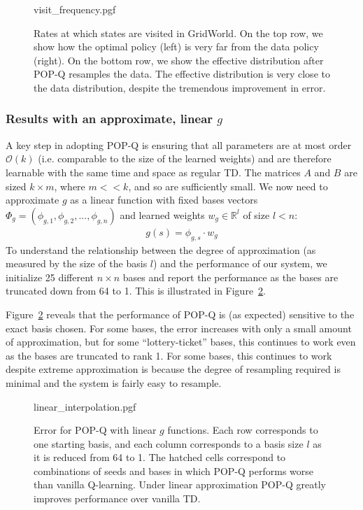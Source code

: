 \begin{figure}[t]
  \centering
  {visit_frequency.pgf}
  \caption{Rates at which states are visited in GridWorld. On the top row, we show how the optimal policy (left) is very far from the data policy (right). On the bottom row, we show the effective distribution after POP-Q resamples the data. The effective distribution is very close to the data distribution, despite the tremendous improvement in error. }
  \label{fig:popresampling}
\end{figure}


\subsubsection[Results with a linear g]{Results with an approximate, linear $g$}

A key step in adopting POP-Q is ensuring that all parameters are at most order $\mathcal O(k)$ (i.e. comparable to the size of the learned weights) and are therefore learnable with the same time and space as regular TD. The matrices $A$ and $B$ are sized $k\times m$, where $m << k$, and so are sufficiently small. We now need to approximate $g$ as a linear function with fixed bases vectors $\Phi_g = (\phi_{g,1}, \phi_{g,2}, ..., \phi_{g,n})$ and learned weights $w_g \in \mathbb R^{l}$ of size $l < n$:
\begin{align}
  g(s) = \phi_{g, s} \cdot w_g
\end{align}
To understand the relationship between the degree of approximation (as measured by the size of the basis $l$) and the performance of our system, we initialize 25 different $n\times n$ bases and report the performance as the bases are truncated down from 64 to 1. This is illustrated in Figure~\ref{fig:linearerr}.

Figure~\ref{fig:linearerr} reveals that the performance of POP-Q is (as expected) sensitive to the exact basis chosen. For some bases, the error increases with only a small amount of approximation, but for some ``lottery-ticket'' bases, this continues to work even as the bases are truncated to rank 1. For some bases, this continues to work despite  extreme approximation is because the degree of resampling required is minimal and the system is fairly easy to resample.


\label{sec:explinearoffpolicy}
\begin{figure}[t]
  \centering
  {linear_interpolation.pgf}
  \caption{Error for POP-Q with linear $g$ functions. Each row corresponds to one starting basis, and each column corresponds to a basis size $l$ as it is reduced from 64 to 1. The hatched cells correspond to combinations of seeds and bases in which POP-Q performs worse than vanilla Q-learning. Under linear approximation POP-Q greatly improves performance over vanilla TD. }
  \label{fig:linearerr}
\end{figure}


